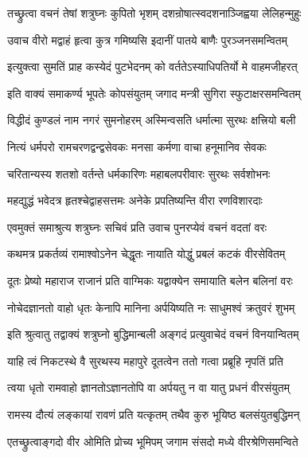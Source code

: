 \twolineshloka
{तच्छ्रुत्वा वचनं तेषां शत्रुघ्नः कुपितो भृशम्}
{दशन्रोषात्स्वदशनाञ्जिह्वया लेलिहन्मुहुः}%

\twolineshloka
{उवाच वीरो मद्वाहं हृत्वा कुत्र गमिष्यसि}
{इदानीं पातये बाणैः पुरञ्जनसमन्वितम्}%

\twolineshloka
{इत्युक्त्वा सुमतिं प्राह कस्येदं पुटभेदनम्}
{को वर्ततेऽस्याधिपतिर्यो मे वाहमजीहरत्}%


\twolineshloka
{इति वाक्यं समाकर्ण्य भूपतेः कोपसंयुतम्}
{जगाद मन्त्री सुगिरा स्फुटाक्षरसमन्वितम्}%

\twolineshloka
{विद्धीदं कुण्डलं नाम नगरं सुमनोहरम्}
{अस्मिन्वसति धर्मात्मा सुरथः क्षत्त्रियो बली}%

\twolineshloka
{नित्यं धर्मपरो रामचरणद्वन्द्वसेवकः}
{मनसा कर्मणा वाचा हनूमानिव सेवकः}%

\twolineshloka
{चरितान्यस्य शतशो वर्तन्ते धर्मकारिणः}
{महाबलपरीवारः सुरथः सर्वशोभनः}%

\twolineshloka
{महद्युद्धं भवेदत्र हृतश्चेद्वाहसत्तमः}
{अनेके प्रपतिष्यन्ति वीरा रणविशारदाः}%

\twolineshloka
{एवमुक्तं समाश्रुत्य शत्रुघ्नः सचिवं प्रति}
{उवाच पुनरप्येवं वचनं वदतां वरः}%


\twolineshloka
{कथमत्र प्रकर्तव्यं रामाश्वोऽनेन चेद्धृतः}
{नायाति योद्धुं प्रबलं कटकं वीरसेवितम्}%


\twolineshloka
{दूतः प्रेष्यो महाराज राजानं प्रति वाग्मिकः}
{यद्वाक्येन समायाति बलेन बलिनां वरः}%

\twolineshloka
{नोचेदज्ञानतो वाहो धृतः केनापि मानिना}
{अर्पयिष्यति नः साधुमश्वं क्रतुवरं शुभम्}%

\twolineshloka
{इति श्रुत्वातु तद्वाक्यं शत्रुघ्नो बुद्धिमान्बली}
{अङ्गदं प्रत्युवाचेदं वचनं विनयान्वितम्}%


\twolineshloka
{याहि त्वं निकटस्थे वै सुरथस्य महापुरे}
{दूतत्वेन ततो गत्वा प्रब्रूहि नृपतिं प्रति}%

\twolineshloka
{त्वया धृतो रामवाहो ज्ञानतोऽज्ञानतोपि वा}
{अर्पयतु न वा यातु प्रधनं वीरसंयुतम्}%

\twolineshloka
{रामस्य दौत्यं लङ्कायां रावणं प्रति यत्कृतम्}
{तथैव कुरु भूयिष्ठ बलसंयुतबुद्धिमन्}%


\twolineshloka
{एतच्छ्रुत्वाङ्गदो वीर ओमिति प्रोच्य भूमिपम्}
{जगाम संसदो मध्ये वीरश्रेणिसमन्विते}%

